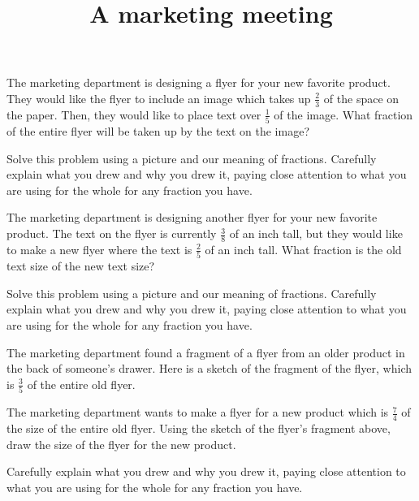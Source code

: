 \documentclass[nooutcomes,noauthor, handout]{ximera}
\title{A marketing meeting}
\begin{document}
\begin{abstract}
\end{abstract}

\maketitle


\begin{problem}
The marketing department is designing a flyer for your new favorite product. They would like the flyer to include an image which takes up $\frac{2}{3}$ of the space on the paper. Then, they would like to place text over $\frac{1}{5}$ of the image. What fraction of the entire flyer will be taken up by the text on the image?

Solve this problem using a picture and our meaning of fractions. Carefully explain what you drew and why you drew it, paying close attention to what you are using for the whole for any fraction you have.
\end{problem}

\begin{problem}
The marketing department is designing another flyer for your new favorite product. The text on the flyer is currently $\frac{3}{8}$ of an inch tall, but they would like to make a new flyer where the text is $\frac{2}{5}$ of an inch tall. What fraction is the old text size of the new text size? 

Solve this problem using a picture and our meaning of fractions. Carefully explain what you drew and why you drew it, paying close attention to what you are using for the whole for any fraction you have.
\end{problem}


\begin{problem}
The marketing department found a fragment of a flyer from an older product in the back of someone's drawer. Here is a sketch of the fragment of the flyer, which is $\frac{3}{5}$ of the entire old flyer. 
\begin{image}
\end{image}
The marketing department wants to make a flyer for a new product which is $\frac{7}{4}$ of the size of the entire old flyer. Using the sketch of the flyer's fragment above, draw the size of the flyer for the new product.

Carefully explain what you drew and why you drew it, paying close attention to what you are using for the whole for any fraction you have.
\end{problem}
\end{document}
